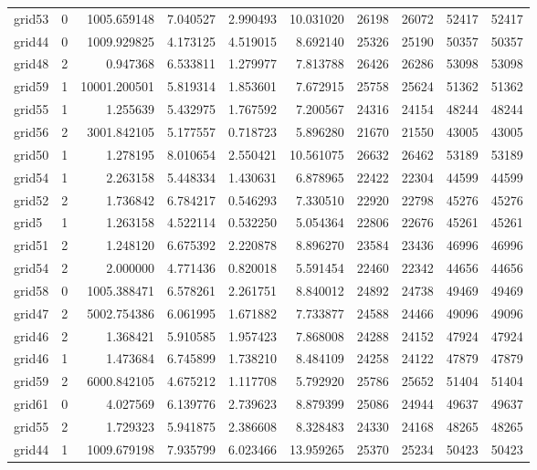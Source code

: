 \begin{longtable}{|l|r|r|r|r|r|r|r|r|r|}
grid53 & 0 & 1005.659148 & 7.040527 & 2.990493 & 10.031020 & 26198 & 26072 & 52417 & 52417 \\
grid44 & 0 & 1009.929825 & 4.173125 & 4.519015 & 8.692140 & 25326 & 25190 & 50357 & 50357 \\
grid48 & 2 & 0.947368 & 6.533811 & 1.279977 & 7.813788 & 26426 & 26286 & 53098 & 53098 \\
grid59 & 1 & 10001.200501 & 5.819314 & 1.853601 & 7.672915 & 25758 & 25624 & 51362 & 51362 \\
grid55 & 1 & 1.255639 & 5.432975 & 1.767592 & 7.200567 & 24316 & 24154 & 48244 & 48244 \\
grid56 & 2 & 3001.842105 & 5.177557 & 0.718723 & 5.896280 & 21670 & 21550 & 43005 & 43005 \\
grid50 & 1 & 1.278195 & 8.010654 & 2.550421 & 10.561075 & 26632 & 26462 & 53189 & 53189 \\
grid54 & 1 & 2.263158 & 5.448334 & 1.430631 & 6.878965 & 22422 & 22304 & 44599 & 44599 \\
grid52 & 2 & 1.736842 & 6.784217 & 0.546293 & 7.330510 & 22920 & 22798 & 45276 & 45276 \\
grid5 & 1 & 1.263158 & 4.522114 & 0.532250 & 5.054364 & 22806 & 22676 & 45261 & 45261 \\
grid51 & 2 & 1.248120 & 6.675392 & 2.220878 & 8.896270 & 23584 & 23436 & 46996 & 46996 \\
grid54 & 2 & 2.000000 & 4.771436 & 0.820018 & 5.591454 & 22460 & 22342 & 44656 & 44656 \\
grid58 & 0 & 1005.388471 & 6.578261 & 2.261751 & 8.840012 & 24892 & 24738 & 49469 & 49469 \\
grid47 & 2 & 5002.754386 & 6.061995 & 1.671882 & 7.733877 & 24588 & 24466 & 49096 & 49096 \\
grid46 & 2 & 1.368421 & 5.910585 & 1.957423 & 7.868008 & 24288 & 24152 & 47924 & 47924 \\
grid46 & 1 & 1.473684 & 6.745899 & 1.738210 & 8.484109 & 24258 & 24122 & 47879 & 47879 \\
grid59 & 2 & 6000.842105 & 4.675212 & 1.117708 & 5.792920 & 25786 & 25652 & 51404 & 51404 \\
grid61 & 0 & 4.027569 & 6.139776 & 2.739623 & 8.879399 & 25086 & 24944 & 49637 & 49637 \\
grid55 & 2 & 1.729323 & 5.941875 & 2.386608 & 8.328483 & 24330 & 24168 & 48265 & 48265 \\
grid44 & 1 & 1009.679198 & 7.935799 & 6.023466 & 13.959265 & 25370 & 25234 & 50423 & 50423 \\

\end{longtable}
